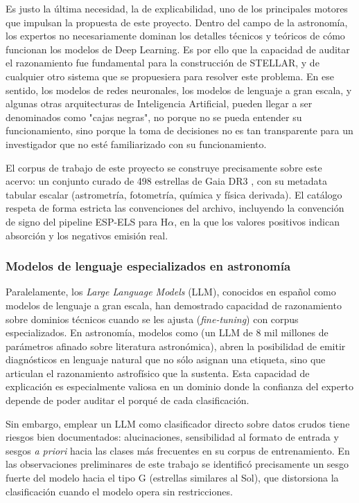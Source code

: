 Es justo la última necesidad, la de explicabilidad, uno de los principales motores
que impulsan la propuesta de este proyecto. Dentro del campo de la astronomía, los
expertos no necesariamente dominan los detalles técnicos y teóricos de cómo funcionan 
los modelos de Deep Learning. Es por ello que la capacidad de auditar el razonamiento
fue fundamental para la construcción de STELLAR, y de cualquier otro sistema que se 
propuesiera para resolver este problema. En ese sentido, los modelos de redes neuronales,
los modelos de lenguaje a gran escala, y algunas otras arquitecturas de Inteligencia 
Artificial, pueden llegar a ser denominados como "cajas negras", no porque no se pueda
entender su funcionamiento, sino porque la toma de decisiones no es tan transparente
para un investigador que no esté familiarizado con su funcionamiento. 

El corpus de trabajo de este proyecto se construye precisamente sobre este
acervo: un conjunto curado de \num{498} estrellas de Gaia DR3 \citep{gaiadr3}, con su
metadata tabular escalar (astrometría, fotometría, química y física derivada).
El catálogo respeta de forma estricta las convenciones del archivo, incluyendo
la convención de signo del pipeline ESP-ELS para H$\alpha$, en la que los
valores positivos indican absorción y los negativos emisión real.

\subsubsection{Modelos de lenguaje especializados en astronomía}

Paralelamente, los \textit{Large Language Models} (LLM), conocidos en español como
modelos de lenguaje a gran escala, han demostrado capacidad
de razonamiento sobre dominios técnicos cuando se les ajusta (\emph{fine-tuning})
con corpus especializados. En astronomía, modelos como \AstroSage{} \citep{astrosage} (un LLM de
\num{8} mil millones de parámetros afinado sobre literatura astronómica),
abren la posibilidad de emitir diagnósticos en lenguaje natural que no sólo
asignan una etiqueta, sino que articulan el razonamiento astrofísico que la
sustenta. Esta capacidad de explicación es especialmente valiosa en un dominio
donde la confianza del experto depende de poder auditar el porqué de cada
clasificación.

Sin embargo, emplear un LLM como clasificador directo sobre datos crudos tiene
riesgos bien documentados: alucinaciones, sensibilidad al formato de entrada y
sesgos \emph{a priori} hacia las clases más frecuentes en su corpus de
entrenamiento. En las observaciones preliminares de este trabajo se identificó
precisamente un sesgo fuerte del modelo hacia el tipo G (estrellas similares al
Sol), que distorsiona la clasificación cuando el modelo opera sin restricciones.

